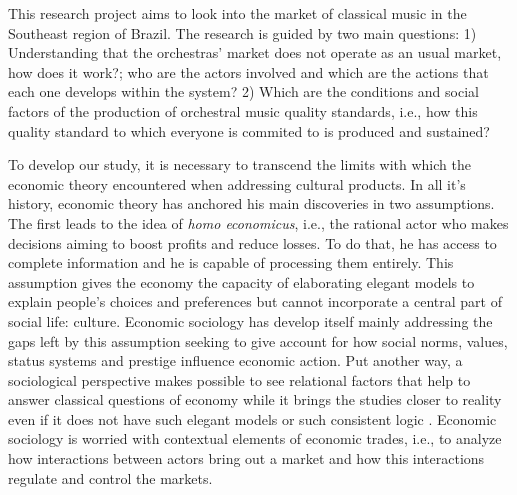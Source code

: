 \documentclass[a4paper, 12pt, openright, oneside, german, french, brazil, english, article]{abntex2}
\begin{document}
	\textual
	\maketitle
	
	
	This research project aims to look into the market of classical music in the Southeast region of Brazil. The research is guided by two main questions: 1) Understanding that the orchestras' market does not operate as an usual market, how does it work?;  who are the actors involved and which are the actions that each one develops within the system? 2) Which are the conditions and social factors of the production of orchestral music quality standards, i.e., how this quality standard to which everyone is commited to is produced and sustained?
	

	To develop our study, it is necessary to transcend the limits with which the economic theory encountered when addressing cultural products. In all it's history, economic theory has anchored his main discoveries in two assumptions. The first leads to the idea of \textit{homo economicus}, i.e., the rational actor who makes decisions aiming to boost profits and reduce losses. To do that, he has access to complete information and he is capable of processing them entirely. This assumption gives the economy the capacity of elaborating elegant models to explain people's choices and preferences but cannot incorporate a central part of social life: culture. Economic sociology has develop itself mainly addressing the gaps left by this assumption seeking to give account for how social norms, values, status systems and prestige influence economic action. Put another way, a sociological perspective makes possible to see relational factors that help to answer classical questions of economy while it brings the studies closer to reality even if it does not have such elegant models or such consistent logic \cite{hirsch1987dirty}. Economic sociology is worried with contextual elements of economic trades, i.e., to analyze how interactions between actors bring out a market and how this interactions regulate and control the markets.
\end{document}
